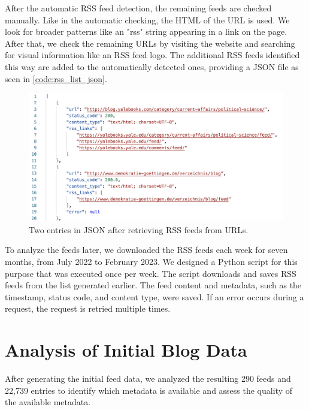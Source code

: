 \documentclass{article}
\begin{document}
After the automatic RSS feed detection, the remaining feeds are checked manually. Like in the automatic checking, the HTML of the URL is used. We look for broader patterns like an "rss" string appearing in a link on the page. After that, we check the remaining URLs by visiting the website and searching for visual information like an RSS feed logo. The additional RSS feeds identified this way are added to the automatically detected ones, providing a JSON file as seen in \autoref{code:rss_list_json}.
\begin{figure}[htb]
    \includegraphics[width=.7\textwidth]{figures/rss_list_json.png}
    \caption{Two entries in JSON after retrieving RSS feeds from URLs.}
    \label{code:rss_list_json}
\end{figure}

To analyze the feeds later, we downloaded the RSS feeds each week for seven months, from July 2022 to February 2023. We designed a Python script for this purpose that was executed once per week. The script downloads and saves RSS feeds from the list generated earlier. The feed content and metadata, such as the timestamp, status code, and content type, were saved. If an error occurs during a request, the request is retried multiple times.

\section{Analysis of Initial Blog Data}\label{sec:analysis}

After generating the initial feed data, we analyzed the resulting 290 feeds and 22,739 entries to identify which metadata is available and assess the quality of the available metadata.
\end{document}
